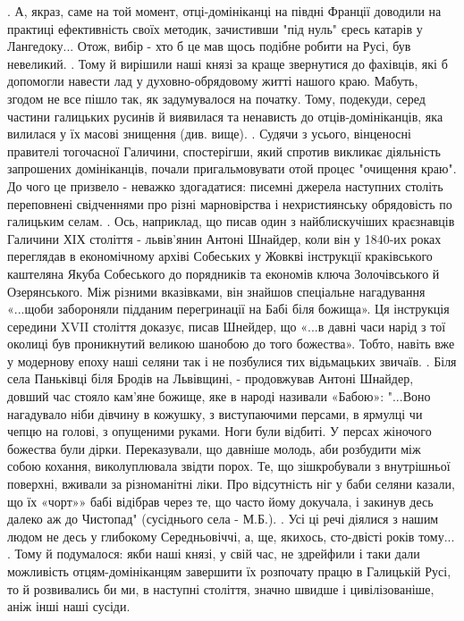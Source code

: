 .
А, якраз, саме на той момент, отці-домініканці на півдні Франції доводили на практиці ефективність своїх методик, зачистивши "під нуль" єресь катарів у Лангедоку... Отож, вибір - хто б це мав щось подібне робити на Русі, був невеликий.
.
Тому й вирішили наші князі за краще звернутися до фахівців, які б допомогли навести лад  у духовно-обрядовому житті нашого краю. Мабуть, згодом не все пішло так, як задумувалося на початку. Тому, подекуди, серед частини галицьких русинів й виявилася та ненависть до отців-домініканців, яка вилилася у їх масові знищення (див. вище).
.
Судячи з усього, вінценосні правителі тогочасної Галичини, спостерігши, який спротив викликає діяльність запрошених домініканців, почали пригальмовувати отой процес "очищення краю". До чого це призвело - неважко здогадатися: писемні джерела наступних століть переповнені свідченнями про різні марновірства і нехристиянську обрядовість по галицьким селам.
.
Ось, наприклад, що писав один з найблискучіших краєзнавців Галичини ХІХ століття - львів'янин Антоні Шнайдер, коли він у 1840-их роках переглядав в економічному архіві Собеських у Жовкві інструкції краківського каштеляна Якуба Собеського до порядників та економів ключа Золочівського й Озерянського. Між різними вказівками, він знайшов спеціальне нагадування  «...щоби забороняли підданим перегринації на Бабі біля божища». Ця інструкція середини XVII століття доказує, писав Шнейдер, що «...в давні часи нарід з тої околиці був проникнутий великою шанобою до того божества». Тобто, навіть вже у модернову епоху наші селяни так і не позбулися тих відьмацьких звичаїв. 
.
Біля села Паньківці біля Бродів на Львівщині, - продовжував Антоні Шнайдер, довший час стояло кам'яне божище, яке в народі називали «Бабою»: "...Воно нагадувало ніби дівчину в кожушку, з виступаючими персами, в ярмулці чи чепцю на голові, з опущеними руками. Ноги були відбиті. У персах жіночого божества були дірки. Переказували, що давніше молодь, аби розбудити між собою кохання, виколуплювала звідти порох. Те, що зішкробували з внутрішньої поверхні, вживали за різноманітні ліки. Про відсутність ніг у баби селяни казали, що їх «чорт»» бабі відібрав через те, що часто йому докучала, і закинув десь далеко аж до Чистопад" (сусіднього села - М.Б.).
.
Усі ці речі діялися з нашим людом не десь у глибокому Середньовіччі, а, ще, якихось, сто-двісті років тому... 
.
Тому й подумалося: якби наші князі, у свій час, не здрейфили і таки дали можливість отцям-домініканцям завершити їх розпочату працю в Галицькій Русі, то й розвивались би ми, в наступні століття, значно швидше і цивілізованіше, аніж інші наші сусіди.
